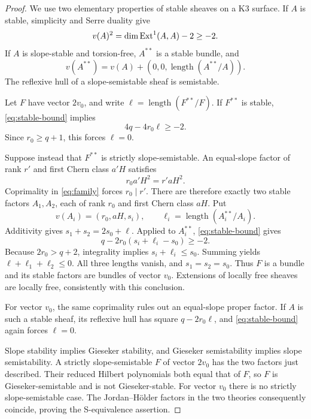 \begin{proof}
We use two elementary properties of stable sheaves on a K3
surface. If $A$ is stable, simplicity and Serre duality give
\begin{equation}\label{eq:stable-bound}
 v(A)^2=\dim\operatorname{Ext}^1(A,A)-2\ge-2.
\end{equation}
If $A$ is slope-stable and torsion-free, $A^{**}$ is a stable
bundle, and
\[
 v(A^{**})=v(A)+(0,0,\operatorname{length}(A^{**}/A)).
\]
The reflexive hull of a slope-semistable sheaf is semistable.

Let $F$ have vector $2v_0$, and write
$\ell=\operatorname{length}(F^{**}/F)$. If $F^{**}$ is stable,
\eqref{eq:stable-bound} implies
\[
 4q-4r_0\ell\ge-2.
\]
Since $r_0\ge q+1$, this forces $\ell=0$.

Suppose instead that $F^{**}$ is strictly slope-semistable.
An equal-slope factor of rank $r'$ and first Chern class $a'H$
satisfies
\[
 r_0a'H^2=r'aH^2.
\]
Coprimality in \eqref{eq:family} forces $r_0\mid r'$.
There are therefore exactly two stable factors $A_1,A_2$, each
of rank $r_0$ and first Chern class $aH$. Put
\[
 v(A_i)=(r_0,aH,s_i),\qquad
 \ell_i=\operatorname{length}(A_i^{**}/A_i).
\]
Additivity gives $s_1+s_2=2s_0+\ell$. Applied to $A_i^{**}$,
\eqref{eq:stable-bound} gives
\begin{equation}\label{eq:factor-inequality}
 q-2r_0(s_i+\ell_i-s_0)\ge-2.
\end{equation}
Because $2r_0>q+2$, integrality implies
$s_i+\ell_i\le s_0$. Summing yields
$\ell+\ell_1+\ell_2\le0$. All three lengths vanish, and
$s_1=s_2=s_0$. Thus $F$ is a bundle and its stable factors are
bundles of vector $v_0$. Extensions of locally free sheaves are
locally free, consistently with this conclusion.

For vector $v_0$, the same coprimality rules out an equal-slope
proper factor. If $A$ is such a stable sheaf, its reflexive hull
has square $q-2r_0\ell$, and \eqref{eq:stable-bound} again forces
$\ell=0$.

Slope stability implies Gieseker stability, and Gieseker
semistability implies slope semistability. A strictly
slope-semistable $F$ of vector $2v_0$ has the two factors just
described. Their reduced Hilbert polynomials both equal that of
$F$, so $F$ is Gieseker-semistable and is not Gieseker-stable.
For vector $v_0$ there is no strictly slope-semistable case.
The Jordan--H\"older factors in the two theories consequently
coincide, proving the S-equivalence assertion.
\end{proof}


